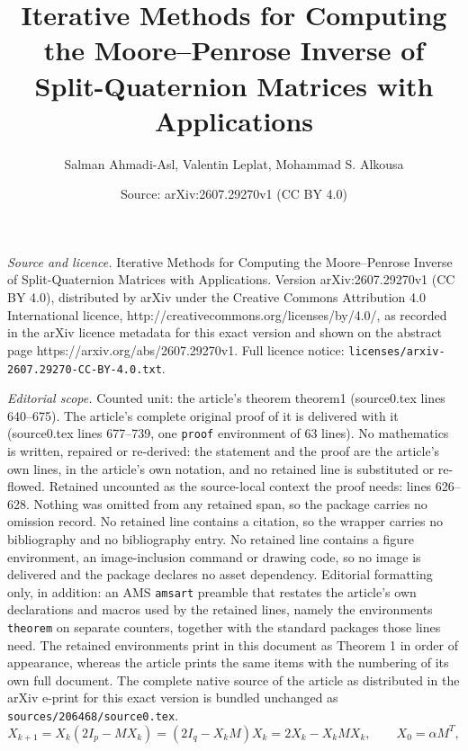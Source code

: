\documentclass[10pt,a4paper]{amsart}
\title{Iterative Methods for Computing the Moore--Penrose Inverse of Split-Quaternion Matrices with Applications}
\author{Salman Ahmadi-Asl, Valentin Leplat, Mohammad S. Alkousa}
\date{Source: arXiv:2607.29270v1 (CC BY 4.0)}
\begin{document}
\maketitle

\noindent\emph{Source and licence.} Iterative Methods for Computing the Moore--Penrose Inverse of Split-Quaternion Matrices with Applications. Version arXiv:2607.29270v1 (CC BY 4.0), distributed by arXiv under the Creative Commons Attribution 4.0 International licence, http://creativecommons.org/licenses/by/4.0/, as recorded in the arXiv licence metadata for this exact version and shown on the abstract page https://arxiv.org/abs/2607.29270v1. Full licence notice: \texttt{licenses/arxiv-2607.29270-CC-BY-4.0.txt}.\par\smallskip

\noindent\textit{Editorial scope.} Counted unit: the article's theorem theorem1 (source0.tex lines 640--675). The article's complete original proof of it is delivered with it (source0.tex lines 677--739, one \texttt{proof} environment of 63 lines). No mathematics is written, repaired or re-derived: the statement and the proof are the article's own lines, in the article's own notation, and no retained line is substituted or re-flowed.  Retained uncounted as the source-local context the proof needs: lines 626--628.  Nothing was omitted from any retained span, so the package carries no omission record.  No retained line contains a citation, so the wrapper carries no bibliography and no bibliography entry.  No retained line contains a figure environment, an image-inclusion command or drawing code, so no image is delivered and the package declares no asset dependency.  Editorial formatting only, in addition: an AMS \texttt{amsart} preamble that restates the article's own declarations and macros used by the retained lines, namely the environments \texttt{theorem} on separate counters, together with the standard packages those lines need.  The retained environments print in this document as Theorem 1 in order of appearance, whereas the article prints the same items with the numbering of its own full document.  The complete native source of the article as distributed in the arXiv e-print for this exact version is bundled unchanged as \texttt{sources/206468/source0.tex}.
\begin{equation} \label{eq:NS_real}
    X_{k+1} = X_k(2I_p-MX_k) = (2I_q-X_kM)X_k = 2X_k-X_kMX_k, \qquad X_0=\alpha M^T,
\end{equation}
\end{document}
